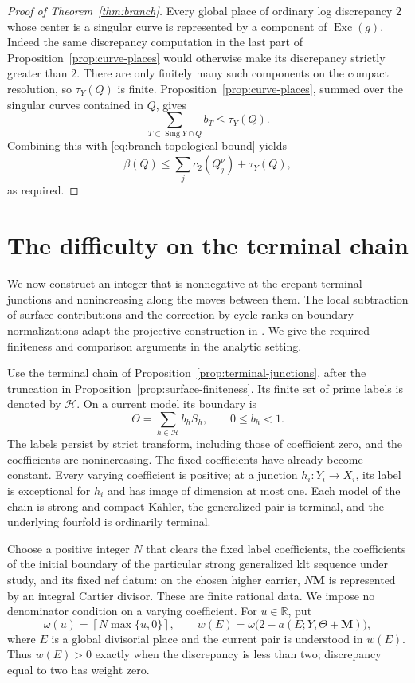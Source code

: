 \documentclass[11pt]{amsart}
\theoremstyle{definition}
\theoremstyle{remark}
\numberwithin{equation}{section}
\newcommand{\R}{\mathbb{R}}
\newcommand{\M}{\mathbf{M}}
\DeclareMathOperator{\Exc}{Exc}
\DeclareMathOperator{\Sing}{Sing}
\begin{document}
\begin{proof}[Proof of Theorem~\ref{thm:branch}]
Every global place of ordinary log discrepancy \(2\) whose center
is a singular curve is represented by a component of \(\Exc(g)\).
Indeed the same discrepancy computation in the last part of
Proposition~\ref{prop:curve-places} would otherwise make its
discrepancy strictly greater than \(2\).  There are only finitely
many such components on the compact resolution, so
\(\tau_Y(Q)\) is finite.  Proposition~\ref{prop:curve-places},
summed over the singular curves contained in \(Q\), gives
\[
 \sum_{T\subset\Sing Y\cap Q} b_T\le\tau_Y(Q).
\]
Combining this with \eqref{eq:branch-topological-bound} yields
\[
 \beta(Q)\le \sum_j c_2(Q_j^\nu)+\tau_Y(Q),
\]
as required.
\end{proof}

\section{The difficulty on the terminal chain}\label{sec:difficulty}

We now construct an integer that is nonnegative at the crepant terminal
junctions and nonincreasing along the moves between them.  The local
subtraction of surface contributions and the correction by cycle ranks on
boundary normalizations adapt the projective construction in
\cite[Definition~4.2, Lemma~4.3, and Section~7]{ProjectiveLCFourfolds}.
We give the required finiteness and comparison arguments in the analytic
setting.

Use the terminal chain of Proposition~\ref{prop:terminal-junctions}, after
the truncation in Proposition~\ref{prop:surface-finiteness}.  Its finite set
of prime labels is denoted by \(\mathcal H\).  On a current model its
boundary is
\[
 \Theta=\sum_{h\in\mathcal H}b_hS_h,\qquad 0\leq b_h<1.
\]
The labels persist by strict transform, including those of coefficient
zero, and the coefficients are nonincreasing.  The fixed coefficients have
already become constant.  Every varying coefficient is positive; at a
junction \(h_i:Y_i\to X_i\), its label is exceptional for \(h_i\) and has
image of dimension at most one.  Each model of the chain is strong and
compact K\"ahler, the generalized pair is terminal, and the underlying
fourfold is ordinarily terminal.

Choose a positive integer \(N\) that clears the fixed label coefficients,
the coefficients of the initial boundary of the particular strong
generalized klt sequence under study, and its fixed nef datum: on the chosen
higher carrier, \(N\M\) is represented by an integral Cartier divisor.
These are finite rational data.  We impose no denominator condition on a
varying coefficient.  For \(u\in\R\), put
\begin{equation}\label{eq:difficulty-weights}
 \omega(u)=\left\lceil N\max\{u,0\}\right\rceil,
 \qquad
 w(E)=\omega\bigl(2-a(E;Y,\Theta+\M)\bigr),
\end{equation}
where \(E\) is a global divisorial place and the current pair is understood
in \(w(E)\).  Thus \(w(E)>0\) exactly when the discrepancy is less than
two; discrepancy equal to two has weight zero.
\end{document}
